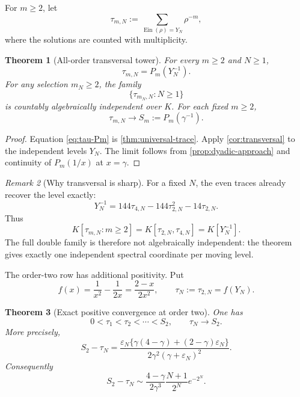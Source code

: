 \documentclass[11pt]{article}
\newtheorem{theorem}{Theorem}[section]
\theoremstyle{definition}
\theoremstyle{remark}
\newtheorem{remark}[theorem]{Remark}
\newcommand{\Ein}{\operatorname{Ein}}
\begin{document}
For \(m\ge2\), let
\begin{equation}\label{eq:tau-mN}
 \tau_{m,N}:=\sum_{\Ein(\rho)=Y_N}\rho^{-m},
\end{equation}
where the solutions are counted with multiplicity.

\begin{theorem}[All-order transversal tower]
\label{thm:all-order-tower}
For every \(m\ge2\) and \(N\ge1\),
\begin{equation}\label{eq:tau-Pm}
 \tau_{m,N}=P_m(Y_N^{-1}).
\end{equation}
For any selection \(m_N\ge2\), the family
\[
 \{\tau_{m_N,N}:N\ge1\}
\]
is countably algebraically independent over \(K\).  For each fixed
\(m\ge2\),
\begin{equation}\label{eq:tau-limit}
 \tau_{m,N}\longrightarrow S_m:=P_m(\gamma^{-1}).
\end{equation}
\end{theorem}

\begin{proof}
Equation \eqref{eq:tau-Pm} is \cref{thm:universal-trace}.  Apply
\cref{cor:transversal} to the independent levels \(Y_N\).  The limit follows
from \cref{prop:dyadic-approach} and continuity of \(P_m(1/x)\) at
\(x=\gamma\).
\end{proof}

\begin{remark}[Why transversal is sharp]
For a fixed \(N\), the even traces already recover the level exactly:
\begin{equation}\label{eq:YN-even-recovery}
 \boxed{\displaystyle
 Y_N^{-1}=144\tau_{4,N}-144\tau_{2,N}^2-14\tau_{2,N}.}
\end{equation}
Thus
\[
 K[\tau_{m,N}:m\ge2]
 =K[\tau_{2,N},\tau_{4,N}]
 =K[Y_N^{-1}].
\]
The full double family is therefore not algebraically independent: the
theorem gives exactly one independent spectral coordinate per moving level.
\end{remark}

The order-two row has additional positivity.  Put
\begin{equation}\label{eq:f-def}
 f(x)=\frac1{x^2}-\frac1{2x}=\frac{2-x}{2x^2},
 \qquad \tau_N:=\tau_{2,N}=f(Y_N).
\end{equation}

\begin{theorem}[Exact positive convergence at order two]
\label{thm:tau2-convergence}
One has
\[
 0<\tau_1<\tau_2<\cdots<S_2,
 \qquad \tau_N\longrightarrow S_2.
\]
More precisely,
\begin{equation}\label{eq:S2-tail-exact}
 \boxed{\displaystyle
 S_2-\tau_N=
 \frac{\varepsilon_N
 \{\gamma(4-\gamma)+(2-\gamma)\varepsilon_N\}}
 {2\gamma^2(\gamma+\varepsilon_N)^2}.}
\end{equation}
Consequently
\begin{equation}\label{eq:S2-tail-asymptotic}
 S_2-\tau_N\sim
 \frac{4-\gamma}{2\gamma^3}
 \frac{N+1}{2^N}e^{-2^N}.
\end{equation}
\end{theorem}
\end{document}
